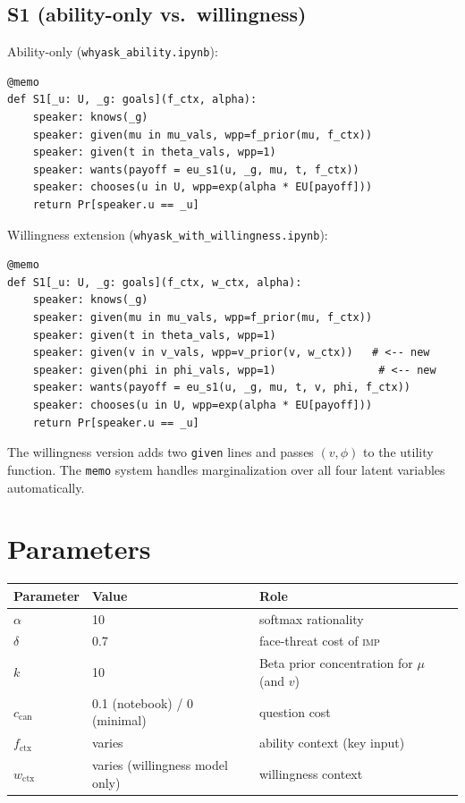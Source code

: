 \documentclass[11pt]{article}
\begin{document}
\subsection{S1 (ability-only vs.\ willingness)}

Ability-only (\texttt{whyask\_ability.ipynb}):
\begin{verbatim}
@memo
def S1[_u: U, _g: goals](f_ctx, alpha):
    speaker: knows(_g)
    speaker: given(mu in mu_vals, wpp=f_prior(mu, f_ctx))
    speaker: given(t in theta_vals, wpp=1)
    speaker: wants(payoff = eu_s1(u, _g, mu, t, f_ctx))
    speaker: chooses(u in U, wpp=exp(alpha * EU[payoff]))
    return Pr[speaker.u == _u]
\end{verbatim}

Willingness extension (\texttt{whyask\_with\_willingness.ipynb}):
\begin{verbatim}
@memo
def S1[_u: U, _g: goals](f_ctx, w_ctx, alpha):
    speaker: knows(_g)
    speaker: given(mu in mu_vals, wpp=f_prior(mu, f_ctx))
    speaker: given(t in theta_vals, wpp=1)
    speaker: given(v in v_vals, wpp=v_prior(v, w_ctx))   # <-- new
    speaker: given(phi in phi_vals, wpp=1)                # <-- new
    speaker: wants(payoff = eu_s1(u, _g, mu, t, v, phi, f_ctx))
    speaker: chooses(u in U, wpp=exp(alpha * EU[payoff]))
    return Pr[speaker.u == _u]
\end{verbatim}

The willingness version adds two \texttt{given} lines and passes $(v, \phi)$ to
the utility function. The \texttt{memo} system handles marginalization over all
four latent variables automatically.

\section{Parameters}

\begin{center}
\renewcommand{\arraystretch}{1.4}
\begin{tabular}{lll}
\toprule
\textbf{Parameter} & \textbf{Value} & \textbf{Role} \\
\midrule
$\alpha$           & 10   & softmax rationality \\
$\delta$           & 0.7  & face-threat cost of \textsc{imp} \\
$k$                & 10   & Beta prior concentration for $\mu$ (and $v$) \\
$c_{\text{can}}$   & 0.1 (notebook) / 0 (minimal) & question cost \\
$f_{\text{ctx}}$   & varies & ability context (key input) \\
$w_{\text{ctx}}$   & varies (willingness model only) & willingness context \\
\bottomrule
\end{tabular}
\end{center}
\end{document}
